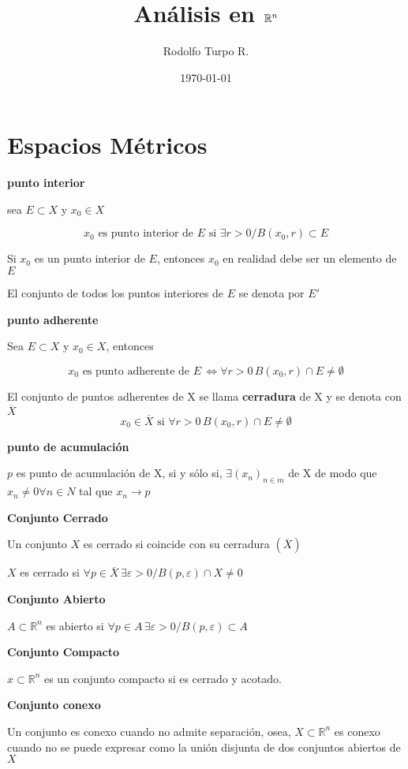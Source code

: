 \documentclass{article}
\title{Análisis en $\R^n$}
\author{Rodolfo Turpo R.}
\date{\today}
\newcommand{\R}{\mathbb R}
\begin{document}
\maketitle
\section{Espacios Métricos}
\noindent\textbf{punto interior}

sea $E\subset X$ y $x_0\in X$

\[x_0\text{ es punto interior de $E$ si }\exists r>0/B(x_0,r)\subset E\]

Si $x_0$ es un punto interior de $E$, entonces $x_0$ en realidad debe ser un elemento de $E$

El conjunto de todos los puntos interiores de $E$ se denota por $E'$

\noindent\textbf{punto adherente}

Sea $E\subset X$ y $x_0\in X$, entonces

\[x_0 \text{ es punto adherente de }E\,\Leftrightarrow \forall r>0\, B(x_0,r)\cap E\neq \emptyset\]

El conjunto de puntos adherentes de X se llama \textbf{cerradura} de X y se denota con $\overline{X}$
\[x_0 \in \overline{X} \text{ si }\forall r>0\, B(x_0,r)\cap E\neq \emptyset\]

\noindent\textbf{punto de acumulación}

$p$ es punto de acumulación de X, si y sólo si, $\exists (x_n)_{n\in m}$ de X de modo que $x_n\neq 0\forall n\in N$ tal que $ x_n \rightarrow p$

\noindent\textbf{Conjunto Cerrado}

Un conjunto $X$ es cerrado si coincide con su cerradura $(\overline{X})$

$X$ es cerrado si $\forall p\in \overline{X}\,\exists\varepsilon>0/B(p,\varepsilon)\cap X\neq 0$

\noindent\textbf{Conjunto Abierto}

$A\subset\R^n$ es abierto si $\forall p\in A\,\exists\varepsilon>0/B(p,\varepsilon)\subset A$

\noindent\textbf{Conjunto Compacto}

$x\subset\R^n$ es un conjunto compacto si es cerrado y acotado.

\noindent\textbf{Conjunto conexo}

Un conjunto es conexo cuando no admite separación, osea, $X\subset\R^n$ es conexo cuando no se puede expresar como la unión disjunta de dos conjuntos abiertos de $X$
\end{document}
